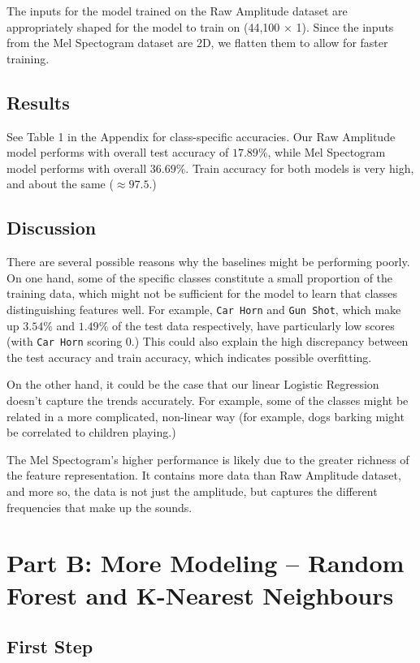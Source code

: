 \documentclass[11pt]{article}
\begin{document}
The inputs for the model trained on the Raw Amplitude dataset are appropriately shaped for the model to train on (44,100 $\times$ 1). Since the inputs from the Mel Spectogram dataset are 2D, we flatten them to allow for faster training.

\subsection{Results}

See Table 1 in the Appendix for class-specific accuracies. Our Raw Amplitude model performs with overall test accuracy of $17.89\%$, while Mel Spectogram model performs with overall $36.69\%$. Train accuracy for both models is very high, and about the same ($\approx 97.5$.)

\subsection{Discussion}

There are several possible reasons why the baselines might be performing poorly. On one hand, some of the specific classes constitute a small proportion of the training data, which might not be sufficient for the model to learn that classes distinguishing features well. For example, \texttt{Car Horn} and \texttt{Gun Shot}, which make up $3.54\%$ and $1.49\%$ of the test data respectively, have particularly low scores (with \texttt{Car Horn} scoring 0.) This could also explain the high discrepancy between the test accuracy and train accuracy, which indicates possible overfitting. 

On the other hand, it could be the case that our linear Logistic Regression doesn't capture the trends accurately. For example, some of the classes might be related in a more complicated, non-linear way (for example, dogs barking might be correlated to children playing.)

The Mel Spectogram's higher performance is likely due to the greater richness of the feature representation. It contains more data than Raw Amplitude dataset, and more so, the data is not just the amplitude, but captures the different frequencies that make up the sounds. 

\section{Part B: More Modeling -- Random Forest and K-Nearest Neighbours}

\subsection{First Step}
\end{document}
